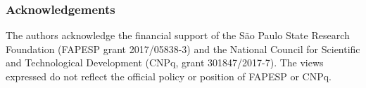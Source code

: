 \documentclass[runningheads]{llncs}
\begin{document}

\subsubsection*{Acknowledgements}
The authors acknowledge the financial support of the S\~ao Paulo State Research Foundation (FAPESP grant 2017/05838-3) and the National Council for Scientific and Technological Development (CNPq, grant 301847/2017-7).  The views expressed do not reflect the official policy or position of FAPESP or CNPq.





%
% 
% 
% 
% 
\end{document}
